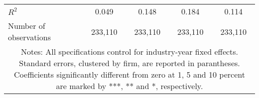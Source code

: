 \begin{tabular}{lcccc}
\\
	$R^2$ 
				& 0.049 
				& 0.148 
				& 0.184 
				& 0.114 \\
	Number of observations 
				& 233,110 
				& 233,110 
				& 233,110 
				& 233,110 \\
\hline \hline
\multicolumn{ 5 }{c}{\begin{minipage}{\textwidth}
\small Notes: All specifications control for industry-year fixed effects. Standard errors, clustered by firm, are reported in parantheses. Coefficients significantly different from zero at 1, 5 and 10 percent are marked by ***, ** and *, respectively.

  \end{minipage} } \\
\end{tabular}